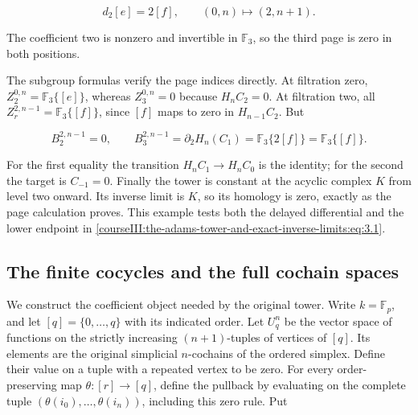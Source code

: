 \begin{equation}
d_2[e]=2[f],
 \qquad (0,n)\longmapsto(2,n+1).
 \label{courseIII:the-adams-tower-and-exact-inverse-limits:eq:7.6}
\end{equation}

The coefficient two is nonzero and invertible in \(\mathbb F_3\), so the third page is zero in both positions.

The subgroup formulas verify the page indices directly. At filtration zero, \(Z_2^{0,n}=\mathbb F_3\{[e]\}\), whereas \(Z_3^{0,n}=0\) because \(H_nC_2=0\). At filtration two, all \(Z_r^{2,n-1}=\mathbb F_3\{[f]\}\), since \([f]\) maps to zero in \(H_{n-1}C_2\). But

\begin{equation}
B_2^{2,n-1}=0,\qquad
 B_3^{2,n-1}=\partial_2 H_n(C_1)
            =\mathbb F_3\{2[f]\}=\mathbb F_3\{[f]\}.
 \label{courseIII:the-adams-tower-and-exact-inverse-limits:eq:7.7}
\end{equation}

For the first equality the transition \(H_nC_1\to H_nC_0\) is the identity; for the second the target is \(C_{-1}=0\). Finally the tower is constant at the acyclic complex \(K\) from level two onward. Its inverse limit is \(K\), so its homology is zero, exactly as the page calculation proves. This example tests both the delayed differential and the lower endpoint in \eqref{courseIII:the-adams-tower-and-exact-inverse-limits:eq:3.1}.

\subsection{The finite cocycles and the full cochain spaces}
\label{courseIII:the-adams-tower-and-exact-inverse-limits:adams-original-cocycles}

\label{courseIII:the-adams-tower-and-exact-inverse-limits:section-8}\label{courseIII:adams-tower:8}

We construct the coefficient object needed by the original tower. Write \(k=\mathbb F_p\), and let \([q]=\{0,\ldots,q\}\) with its indicated order. Let \(U^n_q\) be the vector space of functions on the strictly increasing \((n+1)\)-tuples of vertices of \([q]\). Its elements are the original simplicial \(n\)-cochains of the ordered simplex. Define their value on a tuple with a repeated vertex to be zero. For every order-preserving map \(\theta:[r]\to[q]\), define the pullback by evaluating on the complete tuple \((\theta(i_0),\ldots,\theta(i_n))\), including this zero rule. Put

